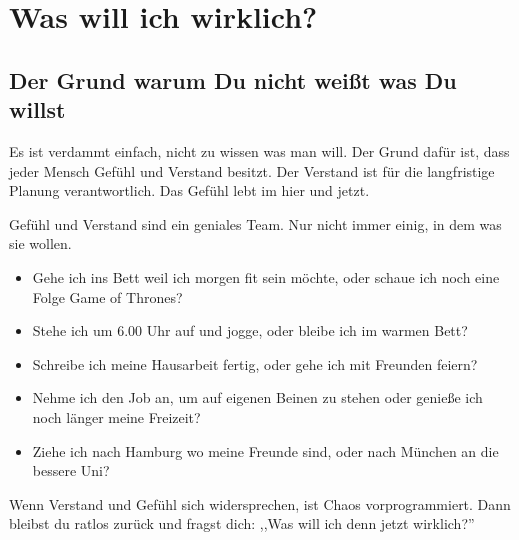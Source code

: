 \documentclass[../Lebensziel.tex]{subfiles}
\begin{document}
\chapter{Was will ich wirklich?}\thispagestyle{fancy}

\section{Der Grund warum Du nicht weißt was Du willst}
Es ist verdammt einfach, nicht zu wissen was man will.
Der Grund dafür ist, dass jeder Mensch Gefühl und Verstand besitzt.
Der Verstand ist für die langfristige Planung verantwortlich.
Das Gefühl lebt im hier und jetzt.

Gefühl und Verstand sind ein geniales Team. Nur nicht immer einig, in dem was sie wollen.
\begin{itemize}
    \item Gehe ich ins Bett weil ich morgen fit sein möchte, oder schaue ich noch eine Folge Game of Thrones?
    \item Stehe ich um 6.00 Uhr auf und jogge, oder bleibe ich im warmen Bett?
    \item Schreibe ich meine Hausarbeit fertig, oder gehe ich mit Freunden feiern?
    \item Nehme ich den Job an, um auf eigenen Beinen zu stehen oder genieße ich noch länger meine Freizeit?
    \item Ziehe ich nach Hamburg wo meine Freunde sind, oder nach München an die bessere Uni?
\end{itemize}

Wenn Verstand und Gefühl sich widersprechen, ist Chaos vorprogrammiert. Dann bleibst du ratlos zurück und fragst dich: ,,Was will ich denn jetzt wirklich?''
\end{document}
